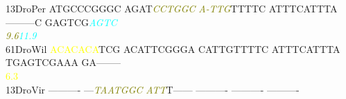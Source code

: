 \documentclass[11pt,twoside,reqno,a4paper]{article}
\begin{document}
{13\hspace*{2\charwidth}DroPer	ATGCCCGGGC	AGAT\textit{\textcolor{olive}{C}}\textit{\textcolor{olive}{C}}\textit{\textcolor{olive}{T}}\textit{\textcolor{olive}{G}}\textit{\textcolor{olive}{G}}\textit{\textcolor{olive}{C}}	\textit{\textcolor{olive}{A}}\textit{\textcolor{olive}{-}}\textit{\textcolor{olive}{T}}\textit{\textcolor{olive}{T}}\textit{\textcolor{olive}{G}}TTTTC	ATTTCATTTA	---------C	GAGTCG\textit{\textcolor{cyan}{A}}\textit{\textcolor{cyan}{G}}\textit{\textcolor{cyan}{T}}\textit{\textcolor{cyan}{C}}	\\
\hspace*{4\charwidth}\hspace*{7\charwidth}\hspace*{1\charwidth}\hspace*{14\charwidth}\textit{\textcolor{olive}{9.6}}\hspace*{1\charwidth}\hspace*{1\charwidth}\hspace*{1\charwidth}\hspace*{1\charwidth}\hspace*{39\charwidth}\textit{\textcolor{cyan}{11.9}}\hspace*{1\charwidth}\\
61\hspace*{2\charwidth}DroWil	\textcolor{yellow}{A}\textcolor{yellow}{C}\textcolor{yellow}{A}\textcolor{yellow}{C}\textcolor{yellow}{A}\textcolor{yellow}{C}\textcolor{yellow}{A}TCG	ACATTCGGGA	CATTGTTTTC	ATTTCATTTA	TGAGTCGAAA	GA--------	\\
\hspace*{4\charwidth}\hspace*{7\charwidth}\hspace*{0\charwidth}\textcolor{yellow}{6.3}\hspace*{1\charwidth}\hspace*{1\charwidth}\hspace*{1\charwidth}\hspace*{1\charwidth}\hspace*{1\charwidth}\hspace*{1\charwidth}\\
13\hspace*{2\charwidth}DroVir	----------	---\textit{\textcolor{olive}{T}}\textit{\textcolor{olive}{A}}\textit{\textcolor{olive}{A}}\textit{\textcolor{olive}{T}}\textit{\textcolor{olive}{G}}\textit{\textcolor{olive}{G}}\textit{\textcolor{olive}{C}}	\textit{\textcolor{olive}{A}}\textit{\textcolor{olive}{T}}\textit{\textcolor{olive}{T}}T------	----------	----------	----------	\\
}
\end{document}
